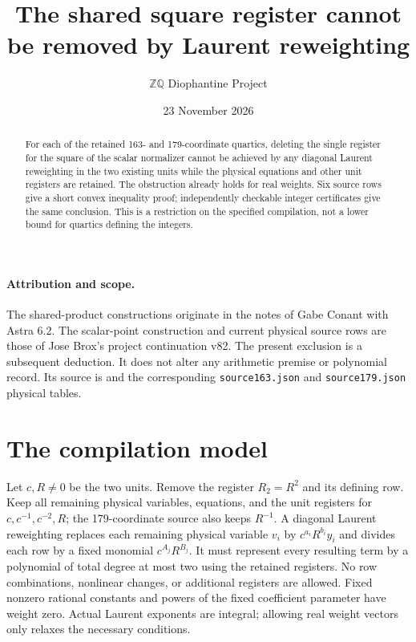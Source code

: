\documentclass[11pt]{article}
\title{The shared square register cannot be removed by Laurent reweighting}
\author{\(\mathbb Z\mathbb Q\) Diophantine Project}
\date{23 November 2026}
\begin{document}
\maketitle
\begin{abstract}
For each of the retained 163- and 179-coordinate quartics, deleting the
single register for the square of the scalar normalizer cannot be achieved
by any diagonal Laurent reweighting in the two existing units while the
physical equations and other unit registers are retained. The obstruction
already holds for real weights. Six source rows give a short convex
inequality proof; independently checkable integer certificates give the
same conclusion. This is a restriction on the specified compilation,
not a lower bound for quartics defining the integers.
\end{abstract}

\paragraph{Attribution and scope.}
The shared-product constructions originate in the notes of Gabe Conant
with Astra 6.2. The scalar-point construction and current physical source
rows are those of Jose Brox's project continuation v82. The present
exclusion is a subsequent deduction. It does not alter any arithmetic
premise or polynomial record. Its source is
and the corresponding \texttt{source163.json} and
\texttt{source179.json} physical tables.

\section{The compilation model}
Let \(c,R\ne0\) be the two units. Remove the register \(R_2=R^2\)
and its defining row. Keep all remaining physical variables, equations,
and the unit registers for \(c,c^{-1},c^{-2},R\); the 179-coordinate
source also keeps \(R^{-1}\). A diagonal Laurent reweighting replaces
each remaining physical variable \(v_i\) by
\(c^{a_i}R^{b_i}y_i\) and divides each row by a fixed monomial
\(c^{A_j}R^{B_j}\). It must represent every resulting term by a
polynomial of total degree at most two using the retained registers.
No row combinations, nonlinear changes, or additional registers are
allowed. Fixed nonzero rational constants and powers of the fixed
coefficient parameter have weight zero. Actual Laurent exponents are
integral; allowing real weight vectors only relaxes the necessary conditions.
\end{document}
